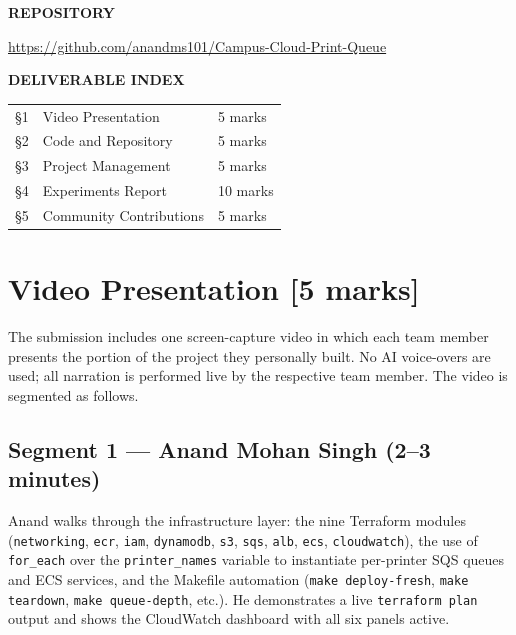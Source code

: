 \documentclass[11pt,letterpaper]{article}
\newcommand{\code}[1]{\texttt{\small #1}}
\begin{document}
\begin{titlepage}
\begin{tcolorbox}[
  colback=surface,
  colframe=border,
  boxrule=0.8pt,
  arc=4pt,
  width=0.82\textwidth,
  left=14pt, right=14pt, top=8pt, bottom=8pt,
]
  {\small\bfseries\color{muted}\MakeUppercase{Repository}\par}
  \vspace{4pt}
  \url{https://github.com/anandms101/Campus-Cloud-Print-Queue}
\end{tcolorbox}

\vfill

\begin{tcolorbox}[
  colback=primary!5,
  colframe=primary!25,
  boxrule=0.6pt,
  arc=3pt,
  width=0.82\textwidth,
  left=12pt, right=12pt, top=7pt, bottom=7pt,
]
  {\small\bfseries\color{muted}\MakeUppercase{Deliverable Index}\par}
  \vspace{4pt}
  \begin{tabular}{@{}lll@{}}
    \S1 & Video Presentation      & 5 marks \\
    \S2 & Code and Repository     & 5 marks \\
    \S3 & Project Management      & 5 marks \\
    \S4 & Experiments Report      & 10 marks \\
    \S5 & Community Contributions & 5 marks \\
  \end{tabular}
\end{tcolorbox}
\end{titlepage}

\tableofcontents
\newpage

\section{Video Presentation [5 marks]}
\label{sec:video}

The submission includes one screen-capture video in which each team member presents the portion of the project they personally built. No AI voice-overs are used; all narration is performed live by the respective team member. The video is segmented as follows.

\subsection{Segment 1 --- Anand Mohan Singh (2--3 minutes)}
Anand walks through the infrastructure layer: the nine Terraform modules (\code{networking}, \code{ecr}, \code{iam}, \code{dynamodb}, \code{s3}, \code{sqs}, \code{alb}, \code{ecs}, \code{cloudwatch}), the use of \code{for\_each} over the \code{printer\_names} variable to instantiate per-printer SQS queues and ECS services, and the Makefile automation (\code{make deploy-fresh}, \code{make teardown}, \code{make queue-depth}, etc.). He demonstrates a live \code{terraform plan} output and shows the CloudWatch dashboard with all six panels active.
\end{document}
